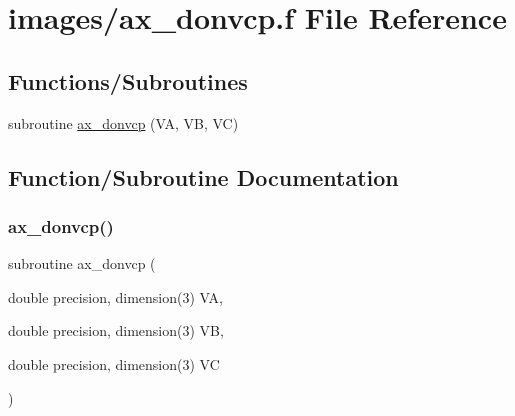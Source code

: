 \hypertarget{ax__donvcp_8f}{}\section{images/ax\+\_\+donvcp.f File Reference}
\label{ax__donvcp_8f}
\subsection*{Functions/\+Subroutines}
\begin{DoxyCompactItemize}
\item 
subroutine \hyperlink{ax__donvcp_8f_a8f73eae5405f24f9508c3d22227e2846}{ax\+\_\+donvcp} (VA, VB, VC)
\end{DoxyCompactItemize}


\subsection{Function/\+Subroutine Documentation}
\mbox{\label{ax__donvcp_8f_a8f73eae5405f24f9508c3d22227e2846}} 
\subsubsection{\texorpdfstring{ax\+\_\+donvcp()}{ax\_donvcp()}}
{\footnotesize\ttfamily subroutine ax\+\_\+donvcp (\begin{DoxyParamCaption}\item[{double precision, dimension(3)}]{VA,  }\item[{double precision, dimension(3)}]{VB,  }\item[{double precision, dimension(3)}]{VC }\end{DoxyParamCaption})}

